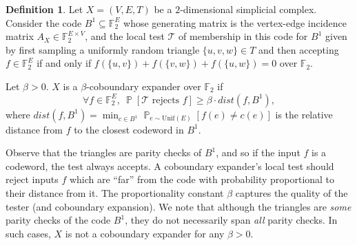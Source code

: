 \documentclass[10pt,a4paper]{article}
\theoremstyle{definition}
\newtheorem{definition}[theorem]{Definition}
\theoremstyle{remark}
\newcommand{\F}{\mathbb{F}}
\newcommand{\Psymb}{\mathbb{P}}
\DeclareMathOperator*{\ProbOp}{\Psymb}
\renewcommand{\Pr}{\ProbOp}
\renewcommand{\ge}{\geqslant}
\numberwithin{equation}{section}
\begin{document}
% 
\begin{definition}
    Let $X = (V,E,T)$ be a $2$-dimensional simplicial complex. Consider the code $B^1 \subseteq \F_2^E$ whose generating matrix is the vertex-edge incidence matrix $A_X\in \F_2^{E\times V}$, and the local test $\mathcal{T}$ of membership in this code for $B^1$ given by first sampling a uniformly random triangle $\{u,v,w\}\in T$ and then accepting $f\in \F_2^E$ if and only if $ f(\{u, v\})+f(\{v, w\})+f(\{u,w\}) = 0$ over $\F_2$. 
    
    Let \(\beta > 0\). $X$ is a $\beta$-coboundary expander over $\F_2$ if 
    \[\forall f \in \F_2^E,~\Pr[\mathcal{T} \text{ rejects }f] \ge \beta\cdot dist(f,B^1),\]
    where $dist(f,B^1) = \min_{c\in B^1}\Pr_{e\sim \mathrm{Unif}(E)}[f(e)\neq c(e)]$ is the relative distance from $f$ to the closest codeword in $B^1$. 
\end{definition}
Observe that the triangles are parity checks of \(B^1\), and so if the input \(f\) is a codeword, the test always accepts. A coboundary expander's local test should reject inputs $f$ which are ``far'' from the code with probability proportional to their distance from it. The proportionality constant \(\beta\) captures the quality of the tester (and coboundary expansion). We note that although the triangles are \emph{some} parity checks of the code $B^1$, they do not necessarily span \emph{all} parity checks. In such cases, \(X\) is not a coboundary expander for any \(\beta > 0\). 

 
\end{document}
